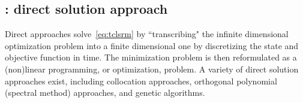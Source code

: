 \subsection{\spatialAcronym: direct solution approach}\label{sec:direct} 

Direct approaches solve~\eqref{eq:tclsrm} by
``transcribing" the infinite dimensional optimization problem into a finite
dimensional one by discretizing the state and objective function in time.
The minimization problem is then reformulated as a (non)linear programming, or
optimization, problem. A variety of direct solution approaches exist, 
including collocation approaches, orthogonal polynomial (spectral  method) 
approaches, and genetic algorithms.  
  

